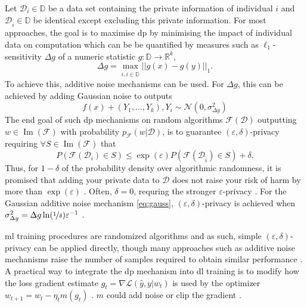 \documentclass[12pt,fleqn,twocolumn]{article}
\newcommand{\RR}{\ensuremath{\mathbb R}}
\newcommand{\DD}{\ensuremath{\mathbb D}}
\newcommand{\reci}{\ensuremath{^{-1}}}
\begin{document}
Let $\mathcal D_i \in \DD$ be a data set containing the private information of individual $i$ and $\mathcal D_{\hat i} \in \DD$ be identical except excluding this private information.
For most approaches, the goal is to maximise \acrshort{dp} by minimising the impact of individual data on computation which can be be quantified by measures such as $\ell_1$-sensitivity \cite[pp.31]{dwork2014alg} $\Delta g$ of a numeric statistic $g: \DD \rightarrow \RR^k$,
\begin{equation}
    \Delta g= \operatorname{max}_{i, \hat i \in \DD} ||g(x)-g(y)||_1.
\end{equation}
To achieve this, additive noise mechanisms can be used.
For $\Delta g$, this can be achieved by adding Gaussian noise to outputs \cite[D 3.3]{dwork2014alg} 
\begin{equation}\label{eq:gauss}
  f(x)+(Y_1, \ldots, Y_k), Y_i \sim \mathcal N(0, \sigma_{\Delta g}^2)  
\end{equation}
The end goal of such \acrshort{dp} mechanisms on random algorithms $\mathcal F(\mathcal D)$ outputting $w \in \operatorname{Im}(\mathcal F)$ with probability $p_{\mathcal F}(w|\mathcal D)$, is to guarantee $(\varepsilon, \delta)$-privacy \cite[Def. 2.4]{dwork2014alg} requiring $\forall S \in \operatorname{Im}(\mathcal F)$ that
\begin{equation}
    P\left(
        \mathcal{F}(\mathcal D_i) \in S
    \right)
    \leq
    \exp(\varepsilon)
    P\left(
        \mathcal{F}(\mathcal D_{\hat i}) \in S
    \right)
    +\delta.
\end{equation}
Thus, for $1-\delta$ of the probability density over algorithmic randomness, it is promised that adding your private data to $\mathcal D$ does not raise your risk of harm by more than $\exp(\varepsilon)$ \cite[pp. 21]{dwork2014alg}.
Often, $\delta=0$, requring the stronger $\varepsilon$-privacy \cite{wiki2022diff}.
For the Gaussian additive noise mechanism \eqref{eq:gauss}, $(\varepsilon, \delta)$-privacy is achieved when $\sigma_{\Delta g}^2=\Delta g \ln(\nicefrac 1 \delta)\varepsilon\reci$ \cite[App. A]{dwork2014alg}.

\acrshort{ml} training procedures are randomized algorithms and as such, simple $(\varepsilon, \delta)$-privacy can be applied directly, though many approaches such as additive noise mechanisms raise the number of samples required to obtain similar performance \cite[pp.221]{dwork2014alg}.
A practical way to integrate the \acrshort{dp} mechanism into \acrshort{dl} training is to modify how the loss gradient estimate $g_t = \nabla \mathcal L(\hat y, y | w_t)$ is used by the optimizer $w_{t+1} = w_t - \eta_t m(g_t)$ \cite{rade2019tensorflow}.
$m$ could add noise or clip the gradient \cite{abadi2016dldp}.
\end{document}
